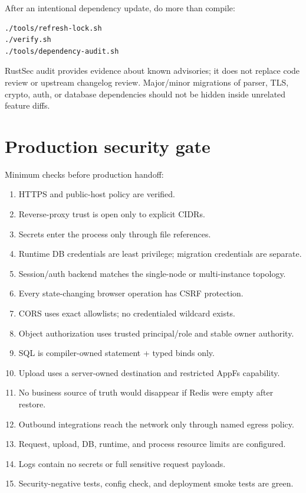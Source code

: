 After an intentional dependency update, do more than compile:

\begin{lstlisting}
./tools/refresh-lock.sh
./verify.sh
./tools/dependency-audit.sh
\end{lstlisting}

RustSec audit provides evidence about known advisories; it does not replace code review or upstream changelog review. Major/minor migrations of parser, TLS, crypto, auth, or database dependencies should not be hidden inside unrelated feature diffs.

\section{Production security gate}

Minimum checks before production handoff:

\begin{enumerate}
  \item HTTPS and public-host policy are verified.
  \item Reverse-proxy trust is open only to explicit CIDRs.
  \item Secrets enter the process only through file references.
  \item Runtime DB credentials are least privilege; migration credentials are separate.
  \item Session/auth backend matches the single-node or multi-instance topology.
  \item Every state-changing browser operation has CSRF protection.
  \item CORS uses exact allowlists; no credentialed wildcard exists.
  \item Object authorization uses trusted principal/role and stable owner authority.
  \item SQL is compiler-owned statement + typed binds only.
  \item Upload uses a server-owned destination and restricted AppFs capability.
  \item No business source of truth would disappear if Redis were empty after restore.
  \item Outbound integrations reach the network only through named egress policy.
  \item Request, upload, DB, runtime, and process resource limits are configured.
  \item Logs contain no secrets or full sensitive request payloads.
  \item Security-negative tests, config check, and deployment smoke tests are green.
\end{enumerate}

